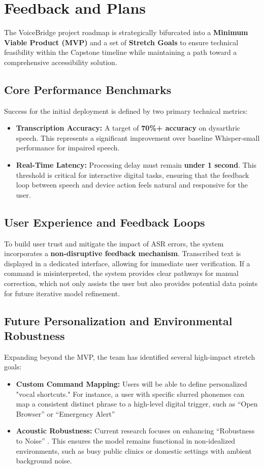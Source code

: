 \documentclass[11pt]{article}
\begin{document}
\section{Feedback and Plans}

The VoiceBridge project roadmap is strategically bifurcated into a \textbf{Minimum Viable Product (MVP)} and a set of \textbf{Stretch Goals} to ensure technical feasibility within the Capstone timeline while maintaining a path toward a comprehensive accessibility solution.
 
\subsection{Core Performance Benchmarks}
Success for the initial deployment is defined by two primary technical metrics:
\begin{itemize}
    \item \textbf{Transcription Accuracy:} A target of \textbf{70\%+ accuracy} on dysarthric speech. This represents a significant improvement over baseline Whisper-small performance for impaired speech.
    \item \textbf{Real-Time Latency:} Processing delay must remain \textbf{under 1 second}. This threshold is critical for interactive digital tasks, ensuring that the feedback loop between speech and device action feels natural and responsive for the user.
\end{itemize}

\subsection{User Experience and Feedback Loops}
To build user trust and mitigate the impact of ASR errors, the system incorporates a \textbf{non-disruptive feedback mechanism}. Transcribed text is displayed in a dedicated interface, allowing for immediate user verification. If a command is misinterpreted, the system provides clear pathways for manual correction, which not only assists the user but also provides potential data points for future iterative model refinement.

\subsection{Future Personalization and Environmental Robustness}
Expanding beyond the MVP, the team has identified several high-impact stretch goals:
\begin{itemize}
    \item \textbf{Custom Command Mapping:} Users will be able to define personalized "vocal shortcuts." For instance, a user with specific slurred phonemes can map a consistent distinct phrase to a high-level digital trigger, such as ``Open Browser'' or ``Emergency Alert''
    \item \textbf{Acoustic Robustness:} Current research focuses on enhancing ``Robustness to Noise'' \citep{sciencedirect_dysarthric}. This ensures the model remains functional in non-idealized environments, such as busy public clinics or domestic settings with ambient background noise.
\end{itemize}
\end{document}
